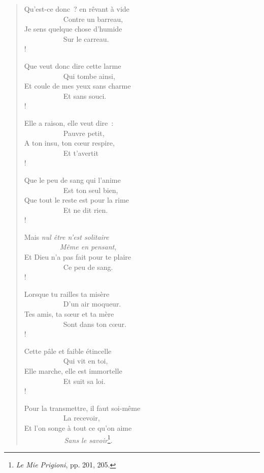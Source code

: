\documentclass[french,twoside]{book} %
\begin{document}
\begin{verse}
Qu’est-ce donc ? en rêvant à vide\\
           Contre un barreau,\\
Je sens quelque chose d’humide\\
           Sur le carreau.\\!

Que veut donc dire cette larme\\
           Qui tombe ainsi,\\
Et coule de mes yeux sans charme\\
           Et sans souci.\\!

Elle a raison, elle veut dire :\\
           Pauvre petit,\\
A ton insu, ton cœur respire,\\
           Et t’avertit\\!

Que le peu de sang qui l’anime\\
           Est ton seul bien,\\
Que tout le reste est pour la rime\\
           Et ne dit rien.\\!

Mais \emph{nul être n’est solitaire}\\
          \emph{Même en pensant},\\
Et Dieu n’a pas fait pour te plaire\\
           Ce peu de sang.\\!

Lorsque tu railles ta misère\\
           D’un air moqueur.\\
Tes amis, ta sœur et ta mère\\
           Sont dans ton cœur.\\!

Cette pâle et faible étincelle\\
           Qui vit en toi,\\
Elle marche, elle est immortelle\\
           Et suit sa loi.\\!

Pour la transmettre, il faut soi-même\\
           La recevoir,\\
Et l’on songe à tout ce qu’on aime\\
\emph{           Sans le savoir}\footnote{\emph{Le Mie Prigioni}, pp. 201, 205.}.\\
\end{verse}
\end{document}

